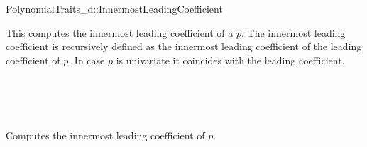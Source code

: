 \begin{ccRefConcept}{PolynomialTraits_d::InnermostLeadingCoefficient}

\ccDefinition

This  computes the innermost leading coefficient
of a  $p$. The innermost leading coefficient is recursively defined as the innermost leading coefficient of the leading coefficient of $p$. In case $p$ is univariate it coincides with the leading coefficient. 

\ccRefines 
{}\\
\\
\\

\ccTypes
{}
\ccGlue
{}
\ccGlue

\ccOperations
{}
         {Computes the innermost leading coefficient of $p$.}

 
\ccSeeAlso

\\

\end{ccRefConcept}
